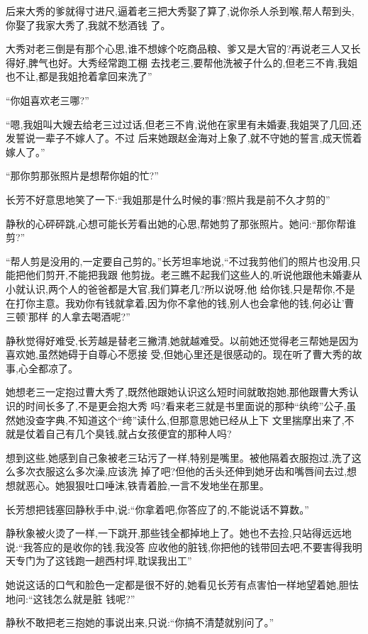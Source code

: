 ﻿\documentclass[12pt]{article}
\begin{document}
后来大秀的爹就得寸进尺,逼着老三把大秀娶了算了,说你杀人杀到喉,帮人帮到头,你娶了我家大秀了,我就不愁酒钱
了。

大秀对老三倒是有那个心思,谁不想嫁个吃商品粮、爹又是大官的?再说老三人又长得好,脾气也好。大秀经常跑工棚
去找老三,要帮他洗被子什么的,但老三不肯,我姐也不让,都是我姐抢着拿回来洗了\myrule ''


``你姐\myrule 喜欢老三哪?''

``嗯,我姐叫大嫂去给老三过过话,但老三不肯,说他在家里有未婚妻,我姐哭了几回,还发誓说一辈子不嫁人了。不过
后来她跟赵金海对上象了,就不守她的誓言,成天慌着嫁人了。''

``那你\myrule 剪那张照片是想帮你姐的忙?''

长芳不好意思地笑了一下:``我姐那是什么时候的事?照片我是前不久才剪的\myrule ''

静秋的心砰砰跳,心想可能长芳看出她的心思,帮她剪了那张照片。她问:``那你\myrule 帮谁剪?''

``帮人剪是没用的,一定要自己剪的。''长芳坦率地说,``不过我剪他们的照片也没用,只能把他们剪开,不能把我跟
他剪拢。老三瞧不起我们这些人的,听说他跟他未婚妻从小就认识,两个人的爸爸都是大官,我们算老几?所以说呀,他
给你钱,只是帮你,不是在打你主意。我劝你有钱就拿着,因为你不拿他的钱,别人也会拿他的钱,何必让'曹三顿'那样
的人拿去喝酒呢?''

静秋觉得好难受,长芳越是替老三撇清,她就越难受。以前她还觉得老三帮她是因为喜欢她,虽然她碍于自尊心不愿接
受,但她心里还是很感动的。现在听了曹大秀的故事,心全都凉了。

她想老三一定抱过曹大秀了,既然他跟她认识这么短时间就敢抱她,那他跟曹大秀认识的时间长多了,不是更会抱大秀
吗?看来老三就是书里面说的那种``纨绔''公子,虽然她没查字典,不知道这个``绔''读什么,但那意思她已经从上下
文里揣摩出来了,不就是仗着自己有几个臭钱,就占女孩便宜的那种人吗?

想到这些,她感到自己象被老三玷污了一样,特别是嘴里。被他隔着衣服抱过,洗了这么多次衣服这么多次澡,应该洗
掉了吧?但他的舌头还伸到她牙齿和嘴唇间去过,想想就恶心。她狠狠吐口唾沫,铁青着脸,一言不发地坐在那里。

长芳想把钱塞回静秋手中,说:``你拿着吧,你答应了的,不能说话不算数。''

静秋象被火烫了一样,一下跳开,那些钱全都掉地上了。她也不去捡,只站得远远地说:``我答应的是收你的钱,我没答
应收他的\myrule 脏钱,你把他的钱带回去吧,不要害得我明天专门为了这钱跑一趟西村坪,耽误我出工\myrule ''

她说这话的口气和脸色一定都是很不好的,她看见长芳有点害怕一样地望着她,胆怯地问:``这钱怎么就是\myrule 脏
钱呢?''

静秋不敢把老三抱她的事说出来,只说:``你搞不清楚就别问了。''
\end{document}
